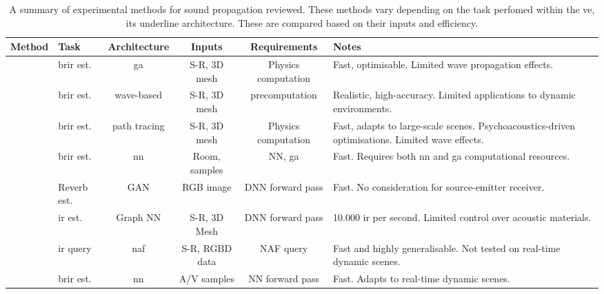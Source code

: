 \begin{landscape}
    \begin{table}[tbp]
        \centering
        \caption{A summary of experimental methods for sound propagation reviewed. These methods vary depending on the task perfomed within the \acrshort{ve}, its underline architecture. These are compared based on their inputs and efficiency.}
            
            \begin{tabularx}{\linewidth}{llcccX}
                \toprule
                Method                                            & Task                     & Architecture   & Inputs                        & Requirements        & Notes \\ \midrule
                \cite{schroder2011physically} & \acrshort{brir} est.     & \acrshort{ga}  & S-R, 3D mesh   & Physics computation              & Fast, optimisable. Limited wave propagation effects. \\
                \cite{mehra2015wave}                              & \acrshort{brir} est.     & wave-based     & S-R, 3D mesh                  & precomputation      & Realistic, high-accuracy. Limited applications to dynamic environments. \\
                \cite{schissler2016interactive}                   & \acrshort{brir} est.     & path tracing   & S-R, 3D mesh                  & Physics computation & Fast, adapts to large-scale scenes. Psychoacoustics-driven optimisations. Limited wave effects. \\
                \cite{tang2020scene}                              & \acrshort{brir} est.     & \acrshort{nn}  & Room, samples\footnotemark[1] & NN, \acrshort{ga}   & Fast. Requires both \acrshort{nn} and \acrshort{ga} computational resources.\\
                \cite{Singh_2021_ICCV}                            & Reverb est.              & GAN            & RGB image                     & DNN forward pass    & Fast. No consideration for source-emitter receiver. \\
                \cite{ratnarajah2022mesh2ir}                      & \acrshort{ir} est.       & Graph NN       & S-R, 3D Mesh                  & DNN forward pass    & 10.000 \acrshort{ir} per second\footnotemark[2]. Limited control over acoustic materials.\\
                \cite{liang2023neural}                            & \acrshort{ir} query      & \acrshort{naf} & S-R, RGBD data                & NAF query           & Fast and highly generalisable. Not tested on real-time dynamic scenes.\\ 
                \cite{chen2023everywhere}                         & \acrshort{brir} est.     & \acrshort{nn}  & A/V samples                   & NN forward pass     & Fast\footnotemark[3]. Adapts to real-time dynamic scenes.\\ \bottomrule
            \end{tabularx}\label{tab:my-table}


\end{table}
\end{landscape}
